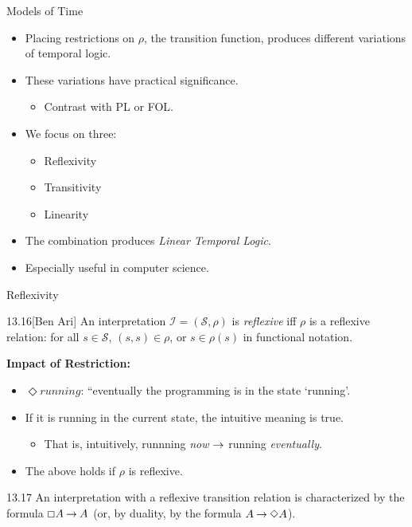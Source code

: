 \documentclass[style=sailor,size=12pt,mode=present]{powerdot}
\begin{document}
\begin{wideslide}[bm=,toc=]{Models of Time}
\begin{itemize}
\item Placing restrictions on $\rho$, the transition function, produces
different variations of temporal logic.
\item These variations have practical significance.
\begin{itemize}
\item Contrast with PL or FOL.
\end{itemize}
\item We focus on three:
\begin{itemize}
\item Reflexivity
\item Transitivity
\item Linearity
\end{itemize}
\item The combination produces \emph{Linear Temporal Logic}.
\item Especially useful in computer science.
\end{itemize}
\end{wideslide}


\begin{wideslide}[bm=,toc=]{Reflexivity}
\begin{defn}{13.16}[Ben Ari]
An interpretation $\mathcal{I} = (\mathcal{S},\rho)$ is \emph{reflexive}
iff $\rho$ is a reflexive relation: for all $s \in \mathcal{S}$, $(s,s) \in
\rho$, or $s \in \rho(s)$ in functional notation.
\end{defn}
{\bf Impact of Restriction:}
\begin{itemize}
\item $\Diamond running$: ``eventually the programming is in the state
`running'.
\item If it is running in the current state, the intuitive meaning is true.
\begin{itemize}
\item That is, intuitively, runnning \emph{now} $\mathbin{\rightarrow}$ running \emph{eventually}.
\end{itemize}
\item The above holds if $\rho$ is reflexive.
\end{itemize}
\begin{thm}{13.17}
An interpretation with a reflexive transition relation is characterized by the
formula $\Box A \mathbin{\rightarrow} A$ (or, by duality, by the formula $A \mathbin{\rightarrow} \Diamond A$).
\end{thm}
\end{wideslide}
\end{document}
